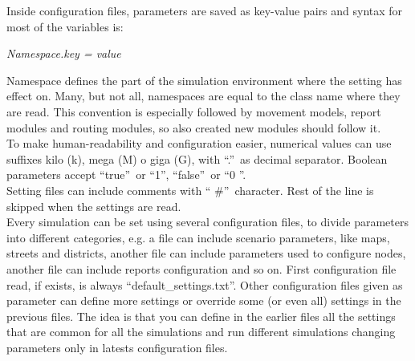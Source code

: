 
Inside configuration files, parameters are saved as key-value pairs and syntax for most of the
variables is:

\begin{center}
\textit{Namespace.key = value}
\end{center}

Namespace defines the part of the simulation environment where the setting has effect on. Many, but not all, namespaces are equal to the class name where they are read. This convention is especially followed by movement models, report modules and routing modules, so also created new modules should follow it.
\\

To make human-readability and configuration easier, numerical values can use suffixes kilo (k), mega (M) o giga (G), with \textquotedblleft .\textquotedblright \ as decimal separator. Boolean parameters accept \textquotedblleft true\textquotedblright \
 or \textquotedblleft 1\textquotedblright , \textquotedblleft false\textquotedblright \ or \textquotedblleft 0 \textquotedblright .
\\
 
Setting files can include comments with \textquotedblleft
\#\textquotedblright \ character. Rest of the line is skipped when the settings are read.
\\

Every simulation can be set using several configuration files, to divide parameters into different categories, e.g. a file can include scenario parameters, like maps, streets and districts, another file can include parameters used to configure nodes, another file can include reports configuration and so on. First configuration file read, if exists, is always \textquotedblleft default\_settings.txt\textquotedblright. Other configuration files given as parameter can define more settings or override some (or even all) settings in the previous files. The idea is that you can define in the earlier files all the settings that are common for all the simulations and run different simulations changing parameters only in latests configuration files.
\\


